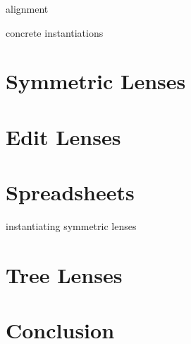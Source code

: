 \documentclass[12pt]{report}
\numberwithin{equation}{section}
\begin{document}
alignment

concrete instantiations

\chapter{Symmetric Lenses}



\chapter{Edit Lenses}

\mlinjargs\mlinjnoargs

\chapter{Spreadsheets}

instantiating symmetric lenses

\chapter{Tree Lenses}



\chapter{Conclusion}



\end{document}
